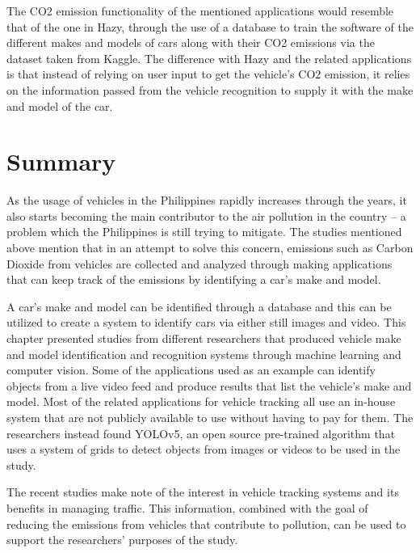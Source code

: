 	The CO2 emission functionality of the mentioned applications would resemble that of the one in Hazy, through the use of a database to train the software of the different makes and models of cars along with their CO2 emissions via the dataset taken from Kaggle. The difference with Hazy and the related applications is that instead of relying on user input to get the vehicle’s CO2 emission, it relies on the information passed from the vehicle recognition to supply it with the make and model of the car.

\section{Summary}
 As the usage of vehicles in the Philippines rapidly increases through the years, it also starts becoming the main contributor to the air pollution in the country – a problem which the Philippines is still trying to mitigate. The studies mentioned above mention that in an attempt to solve this concern, emissions such as Carbon Dioxide from vehicles are collected and analyzed through making applications that can keep track of the emissions by identifying a car’s make and model.

	A car’s make and model can be identified through a database and this can be utilized to create a system to identify cars via either still images and video. This chapter presented studies from different researchers that produced vehicle make and model identification and recognition systems through machine learning and computer vision. Some of the applications used as an example can identify objects from a live video feed and produce results that list the vehicle’s make and model. Most of the related applications for vehicle tracking all use an in-house system that are  not publicly available to use without having to pay for them. The researchers instead found YOLOv5, an open source pre-trained algorithm that uses a system of grids to detect objects from images or videos to be used in the study.

	The recent studies make note of the interest in vehicle tracking systems and its benefits in managing traffic. This information, combined with the goal of reducing the emissions from vehicles that contribute to pollution, can be used to support the researchers’ purposes of the study.



